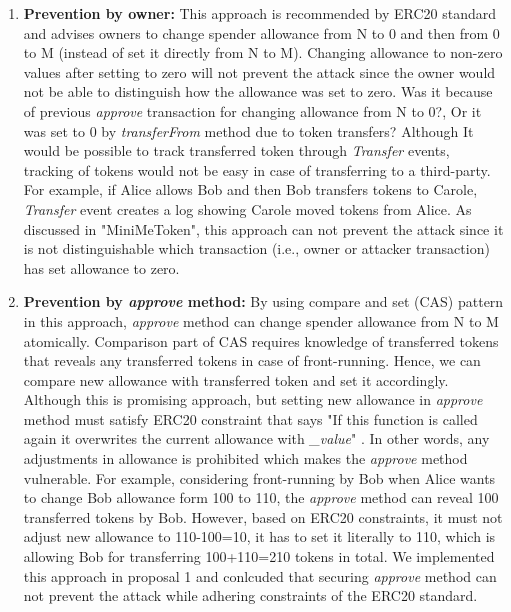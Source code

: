 \begin{enumerate}
	\item \textbf{Prevention by owner:} This approach is recommended by ERC20 standard \cite{Ref08} and advises owners to change spender allowance from N to 0 and then from 0 to M (instead of set it directly from N to M). Changing allowance to non-zero values after setting to zero will not prevent the attack since the owner would not be able to distinguish how the allowance was set to zero. Was it because of previous \textit{approve} transaction for changing allowance from N to 0?, Or it was set to 0 by \textit{transferFrom} method due to token transfers? Although It would be possible to track transferred token through \textit{Transfer} events, tracking of tokens would not be easy in case of transferring to a third-party. For example, if Alice allows Bob and then Bob transfers tokens to Carole, \textit{Transfer} event creates a log showing Carole moved tokens from Alice. As discussed in "MiniMeToken", this approach can not prevent the attack since it is not distinguishable which transaction (i.e., owner or attacker transaction) has set allowance to zero.\newline
	
	\item \textbf{Prevention by \textit{approve} method:} By using compare and set (CAS) pattern \cite{Ref06} in this approach, \textit{approve} method can change spender allowance from N to M atomically. Comparison part of CAS requires knowledge of transferred tokens that reveals any transferred tokens in case of front-running. Hence, we can compare new allowance with transferred token and set it accordingly. Although this is promising approach, but setting new allowance in \textit{approve} method must satisfy ERC20 constraint that says "If this function is called again it overwrites the current allowance with \textit{\_value}" \cite{Ref08}. In other words, any adjustments in allowance is prohibited which makes the \textit{approve} method vulnerable. For example, considering front-running by Bob when Alice wants to change Bob allowance form 100 to 110, the \textit{approve} method can reveal 100 transferred tokens by Bob. However, based on ERC20 constraints, it must not adjust new allowance to 110-100=10, it has to set it literally to 110, which is allowing Bob for transferring 100+110=210 tokens in total. We implemented this approach in proposal 1 and conlcuded that securing \textit{approve} method can not prevent the attack while adhering constraints of the ERC20 standard.\newline
	

\end{enumerate}
